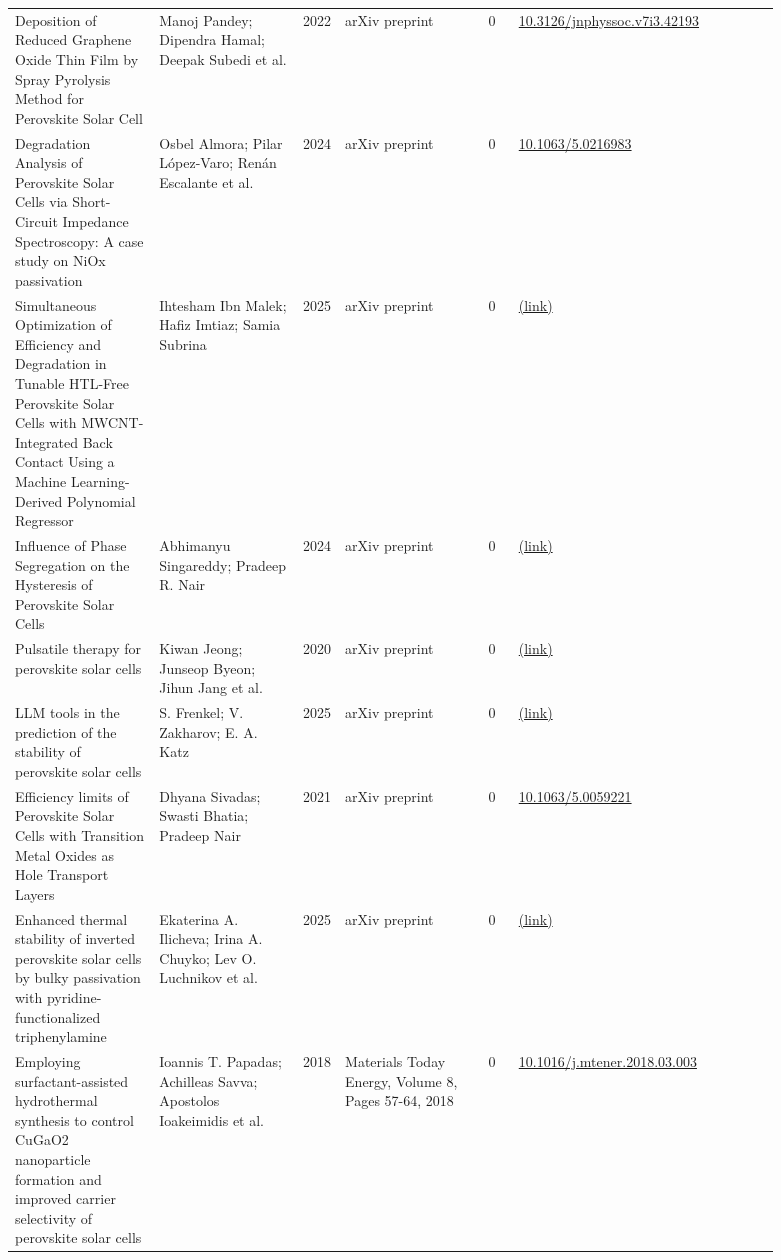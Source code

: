 \documentclass[10pt,a4paper]{article}
\begin{document}
{\begin{longtable}{p{0.197\linewidth}p{0.197\linewidth}p{0.043\linewidth}p{0.197\linewidth}p{0.043\linewidth}p{0.117\linewidth}p{0.098\linewidth}}
Deposition of Reduced Graphene Oxide Thin Film by Spray Pyrolysis Method for Perovskite Solar Cell & Manoj Pandey; Dipendra Hamal; Deepak Subedi et al. & 2022 & arXiv preprint & 0 & \href{https://doi.org/10.3126/jnphyssoc.v7i3.42193}{10.3126/jnphyssoc.v7i3.42193} &  \\
Degradation Analysis of Perovskite Solar Cells via Short-Circuit Impedance Spectroscopy: A case study on NiOx passivation & Osbel Almora; Pilar López-Varo; Renán Escalante et al. & 2024 & arXiv preprint & 0 & \href{https://doi.org/10.1063/5.0216983}{10.1063/5.0216983} &  \\
Simultaneous Optimization of Efficiency and Degradation in Tunable HTL-Free Perovskite Solar Cells with MWCNT-Integrated Back Contact Using a Machine Learning-Derived Polynomial Regressor & Ihtesham Ibn Malek; Hafiz Imtiaz; Samia Subrina & 2025 & arXiv preprint & 0 & \href{http://arxiv.org/abs/2505.18693v1}{(link)} &  \\
Influence of Phase Segregation on the Hysteresis of Perovskite Solar Cells & Abhimanyu Singareddy; Pradeep R. Nair & 2024 & arXiv preprint & 0 & \href{http://arxiv.org/abs/2412.15558v1}{(link)} &  \\
Pulsatile therapy for perovskite solar cells & Kiwan Jeong; Junseop Byeon; Jihun Jang et al. & 2020 & arXiv preprint & 0 & \href{http://arxiv.org/abs/2007.06190v1}{(link)} &  \\
LLM tools in the prediction of the stability of perovskite solar cells & S. Frenkel; V. Zakharov; E. A. Katz & 2025 & arXiv preprint & 0 & \href{http://arxiv.org/abs/2512.11615v2}{(link)} &  \\
Efficiency limits of Perovskite Solar Cells with Transition Metal Oxides as Hole Transport Layers & Dhyana Sivadas; Swasti Bhatia; Pradeep Nair & 2021 & arXiv preprint & 0 & \href{https://doi.org/10.1063/5.0059221}{10.1063/5.0059221} &  \\
Enhanced thermal stability of inverted perovskite solar cells by bulky passivation with pyridine-functionalized triphenylamine & Ekaterina A. Ilicheva; Irina A. Chuyko; Lev O. Luchnikov et al. & 2025 & arXiv preprint & 0 & \href{http://arxiv.org/abs/2510.08401v1}{(link)} &  \\
Employing surfactant-assisted hydrothermal synthesis to control CuGaO2 nanoparticle formation and improved carrier selectivity of perovskite solar cells & Ioannis T. Papadas; Achilleas Savva; Apostolos Ioakeimidis et al. & 2018 & Materials Today Energy, Volume 8, Pages 57-64, 2018 & 0 & \href{https://doi.org/10.1016/j.mtener.2018.03.003}{10.1016/j.mtener.2018.03.003} &  \\

\end{longtable}}
\end{document}

